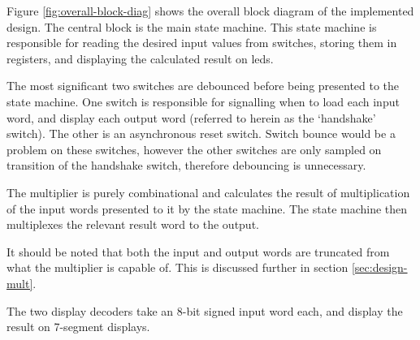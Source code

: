 Figure \ref{fig:overall-block-diag} shows the overall block diagram of the implemented design. The central block is the main state machine. This state machine is responsible for reading the desired input values from switches, storing them in registers, and displaying the calculated result on \glspl{led}.

The most significant two switches are debounced before being presented to the state machine. One switch is responsible for signalling when to load each input word, and display each output word (referred to herein as the `handshake' switch). The other is an asynchronous reset switch. Switch bounce would be a problem on these switches, however the other switches are only sampled on transition of the handshake switch, therefore debouncing is unnecessary.

The multiplier is purely combinational and calculates the result of multiplication of the input words presented to it by the state machine. The state machine then multiplexes the relevant result word to the output.

It should be noted that both the input and output words are truncated from what the multiplier is capable of. This is discussed further in section \ref{sec:design-mult}.

The two display decoders take an 8-bit signed input word each, and display the result on 7-segment displays.



